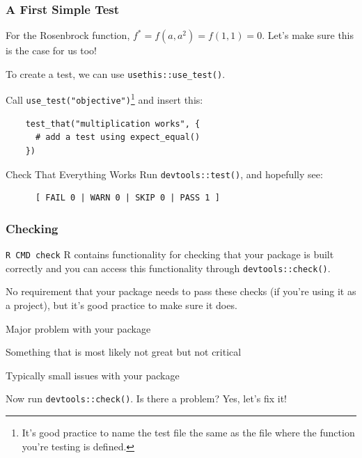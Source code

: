 \documentclass[aspectratio=1610,onlytextwidth]{beamer}
\begin{document}
\begin{frame}[c,fragile]
  \frametitle{A First Simple Test}

  For the Rosenbrock function, \(f^* = f(a,a^2) = f(1,1) = 0\). Let's make sure this is the case for us too!

  \bigskip\pause

  To create a test, we can use \lstinline[basicstyle=\ttfamily]{usethis::use_test()}.

  \bigskip\pause

  Call \lstinline[basicstyle=\ttfamily]{use_test("objective")}\footnote<3->{It's good practice to name the test file the same as the file where the function you're testing is defined.} and insert this:
  \begin{lstlisting}
    test_that("multiplication works", {
      # add a test using expect_equal()
    })
  \end{lstlisting}

  \medskip\pause

  \begin{block}{Check That Everything Works}
    Run \lstinline[basicstyle=\ttfamily]{devtools::test()}, and hopefully see:

    \medskip

    \begin{lstlisting}
      [ FAIL 0 | WARN 0 | SKIP 0 | PASS 1 ]
    \end{lstlisting}
  \end{block}
\end{frame}

\begin{frame}[c]
  \frametitle{Checking}
  \begin{block}{\texttt{R CMD check}}
    R contains functionality for checking that your package is built correctly and you can
    access this functionality through \lstinline{devtools::check()}.
  \end{block}

  \bigskip\pause

  No requirement that your package needs to pass these checks (if you're using it as a project), but it's
  good practice to make sure it does.

  \bigskip\pause

  \begin{description}[<+->]
    \item[ERROR] Major problem with your package
    \item[WARNING] Something that is most likely not great but not critical
    \item[NOTE] Typically small issues with your package
  \end{description}

  \bigskip\pause

  Now run \lstinline{devtools::check()}. Is there a problem? Yes, let's fix it!

\end{frame}
\end{document}
